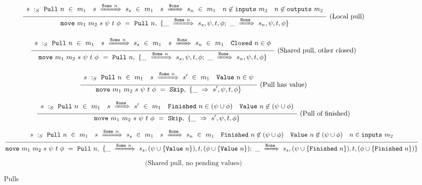 \begin{figure*}


$$
\ruleI
{
    \arrLCCCR
        { \CheckStateTypeM{m_1}{s}{\Pull{n}} }
        { \TransM{s}{\Some{n}}{s_s}{m_1} }
        { \TransM{s}{\None}{s_n}{m_1} }
        { n \not\in \inputs{m_2} }
        { n \not\in \outputs{m_2} }
}
{
    \MoveOut
        {\sptp}
        {\Pull{n}}
        { \MoveT{\Some{n}}{s_s, \psi, t, \phi}
         ;~
          \MoveT{\None}{s_n, \psi, t, \phi} }
}
\textrm{(Local pull)}
$$

$$
\ruleI
{
    \arrLCCR
        { \CheckStateTypeM{m_1}{s}{\Pull{n}} }
        { \TransM{s}{\Some{n}}{s_s}{m_1} }
        { \TransM{s}{\None}{s_n}{m_1} }
        { \Closed{n} \in \phi }
}
{
    \MoveOut
        {\sptp}
        {\Pull{n}}
        { \MoveT{\Some{n}}{s_s, \psi, t, \phi}
         ;~
          \MoveT{\None}{s_n, \psi, t, \phi} }
}
\textrm{(Shared pull, other closed)}
$$


$$
\ruleI
{
    \arrLCR
        { \CheckStateTypeM{m_1}{s}{\Pull{n}} }
        { \TransM{s}{\Some{n}}{s'}{m_1} }
        { \Value{n} \in \psi }
}
{
    \MoveOut
        {\sptp}
        {\Skip}
        { \MoveTU{\sPptpC} }
}
\textrm{(Pull has value)}
$$

$$
\ruleI
{
    \arrLCCR
        { \CheckStateTypeM{m_1}{s}{\Pull{n}} }
        { \TransM{s}{\None}{s'}{m_1} }
        { \Finished{n} \in (\psi \cup \phi) }
        { \Value{n} \not\in (\psi \cup \phi) }
}
{
    \MoveOut
        {\sptp}
        {\Skip}
        { \MoveTU{\sPptpC} }
}
\textrm{(Pull of finished)}
$$

$$
\ruleI
{
        \CheckStateTypeM{m_1}{s}{\Pull{n}}
        \quad
        \TransM{s}{\Some{n}}{s_s}{m_1}
        \quad
        \TransM{s}{\None}{s_n}{m_1}
        \quad
        \Finished{n} \not\in (\psi \cup \phi)
        \quad
        \Value{n} \not\in (\psi \cup \phi)
        \quad
        n \in \inputs{m_2}
}
{
    \MoveOut
        {\sptp}
        {\Pull{n}}
        { \MoveT{\Some{n}}{s_s, (\psi \cup \{ \Value{n} \}), t, (\phi \cup \{ \Value{n} \}) }
         ;~
          \MoveT{\None}{s_s, (\psi \cup \{ \Finished{n} \}), t, (\phi \cup \{ \Finished{n} \}) }
         }
}
$$
$$\textrm{(Shared pull, no pending values)}$$

\caption{Pulls}
\label{fig:merge:gen:pull}
\end{figure*}

